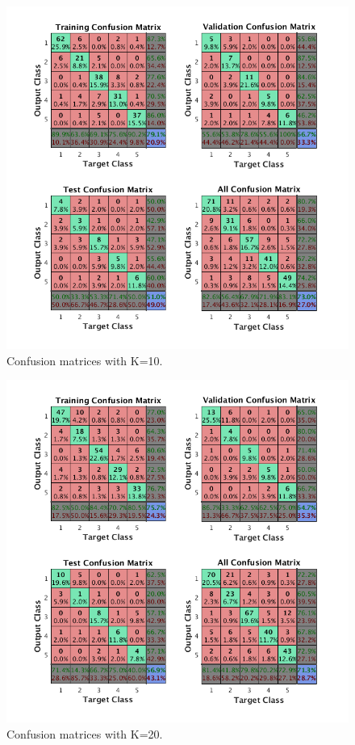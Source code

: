 \documentclass{article}
\begin{document}
\begin{figure}[h]
\centering
\includegraphics[scale=0.5]{Figures/Metrics/conf_k10}
\caption{Confusion matrices with K=10.}
\label{fig:k10}
\end{figure}
\begin{figure}[h]
\centering
\includegraphics[scale=0.5]{Figures/Metrics/conf_k20}
\caption{Confusion matrices with K=20.}
\label{fig:k20}
\end{figure}
\end{document}
